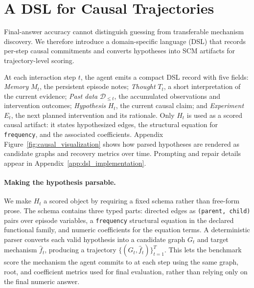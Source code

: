 \section{A DSL for Causal Trajectories}
\label{sec:dsl}

Final-answer accuracy cannot distinguish guessing from transferable mechanism discovery. We therefore introduce a domain-specific language (DSL) that records per-step causal commitments and converts hypotheses into SCM artifacts for trajectory-level scoring.

At each interaction step \(t\), the agent emits a compact DSL record with five
fields: \emph{Memory} \(M_t\), the persistent episode notes; \emph{Thought}
\(T_t\), a short interpretation of the current evidence; \emph{Past data}
\(\mathcal{D}_{\le t}\), the accumulated observations and intervention
outcomes; \emph{Hypothesis} \(H_t\), the current causal claim; and
\emph{Experiment} \(E_t\), the next planned intervention and its rationale.
Only \(H_t\) is used as a scored causal artifact: it states hypothesized edges,
the structural equation for \texttt{frequency}, and the associated
coefficients. Appendix Figure~\ref{fig:causal_visualization} shows how parsed
hypotheses are rendered as candidate graphs and recovery metrics over time.
Prompting and repair details appear in Appendix~\ref{app:dsl_implementation}.

\paragraph{Making the hypothesis parsable.}
We make \(H_t\) a scored object by requiring a fixed schema rather than
free-form prose. The schema contains three typed parts: directed edges as
\texttt{(parent, child)} pairs over episode variables, a \texttt{frequency}
structural equation in the declared functional family, and numeric coefficients
for the equation terms. A deterministic parser converts each valid hypothesis
into a candidate graph \(G_t\) and target mechanism \(\hat f_t\), producing a
trajectory \(\{(G_t,\hat f_t)\}_{t=1}^{T}\). This lets the benchmark score the
mechanism the agent commits to at each step using the same graph, root, and
coefficient metrics used for final evaluation, rather than relying only on the
final numeric answer.

